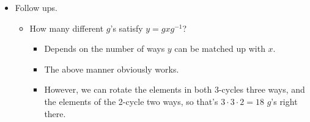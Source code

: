 \documentclass[../notes.tex]{subfiles}
\begin{document}
\begin{itemize}
\begin{proof}
        Let
        \begin{align*}
            x &= (1,2,3)(4,5,6)(7,10)&
            y &= (2,3)(4,1,5)(6,9,10)
        \end{align*}
        Note that both have the same cycle shape: $3+3+2+1+1$. We now use a two-step process to define a $g$ such that $y=gxg^{-1}$.\par
        Step 1: Including 1-cycles, line both $x$ and $y$ up so they "match."
        \begingroup
        \small
        \renewcommand{\arraystretch}{1.2}
        \begin{equation*}
            \begin{NiceArray}{c|c@{}ccc@{}c@{}ccc@{}c@{}cc@{}c@{}c@{}c@{}c@{}c}
                x        & (&  1   &  2   &  3   &)(&  4   &  5   &  6   &)(&  7   &  10   &)(&  8   &)(&  9   &)\\
                \hline
                y        & (&  4   &  1   &  5   &)(&  6   &  9   &  10  &)(&  2   &  3    &)(&  7   &)(&  8   &)\\
                \hline
                gxg^{-1} & (& g(1) & g(2) & g(3) &)(& g(4) & g(5) & g(6) &)(& g(7) & g(10) &)(& g(8) &)(& g(9) &)\\
            \end{NiceArray}
        \end{equation*}
        \endgroup
        Step 2: We want $y=gxg^{-1}$. Thus, take $g$ to be the map which sends every entry in $gxg^{-1}$ to the entry of $y$ directly above it. For example, we want $g(1)=4$, $g(2)=1$, $g(3)=5$, \dots. Noting that $g(1)=4$, $g(4)=6$, $g(6)=10$, \dots, we realize that $g$ can actually be written as the following cycle.
        \begin{equation*}
            g = (1,4,6,10,3,5,9,8,7,2)
        \end{equation*}
    \end{proof}
    \item Follow ups.
    \begin{itemize}
        \item How many different $g$'s satisfy $y=gxg^{-1}$?
        \begin{itemize}
            \item Depends on the number of ways $y$ can be matched up with $x$.
            \item The above manner obviously works.
            \item However, we can rotate the elements in both 3-cycles three ways, and the elements of the 2-cycle two ways, so that's $3\cdot 3\cdot 2=18$ $g$'s right there.

\end{itemize}
\end{itemize}
\end{itemize}
\end{document}
